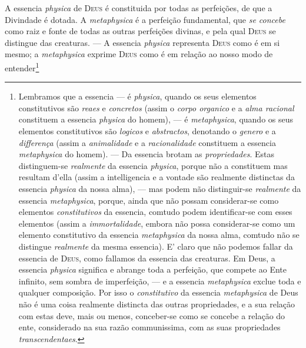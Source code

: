  A essencia \emph{physica} de
\textsc{Deus} é constituida por todas as perfeições, de que a Divindade é dotada. A
\emph{metaphysica} é a perfeição fundamental, que \emph{se concebe} como raiz e fonte de
todas as outras perfeições divinas, e pela qual \textsc{Deus} se distingue das
creaturas. --- A essencia \emph{physica} representa \textsc{Deus} como é em si mesmo; a
\emph{metaphysica} exprime \textsc{Deus} como é em relação ao nosso modo de
entender\footnote{Lembramos que a essencia --- é \emph{physica}, quando os seus elementos
constitutivos são \emph{reaes} e \emph{concretos} (assim o \emph{corpo organico} e a
\emph{alma racional} constituem a essencia \emph{physica} do homem), --- é
\emph{metaphysica}, quando os seus elementos constitutivos são \emph{logicos} e
\emph{abstractos}, denotando o \emph{genero} e a \emph{differença} (assim a
\emph{animalidade} e a \emph{racionalidade} constituem a essencia \emph{metaphysica} do
homem). --- Da essencia brotam as \emph{propriedades}. Estas distinguem-se
\emph{realmente} da essencia \emph{physica}, porque não a constituem mas resultam d'ella
(assim a intelligencia e a vontade são realmente distinctas da essencia \emph{physica} da
nossa alma), --- mas podem não distinguir-se \emph{realmente} da essencia
\emph{metaphysica}, porque, ainda que não possam considerar-se como elementos
\emph{constitutivos} da essencia, comtudo podem identificar-se com esses elementos (assim
a \emph{immortalidade}, embora não possa considerar-se como um elemento constitutivo da
essencia \emph{metaphysica} da nossa alma, comtudo não se distingue \emph{realmente} da
mesma essencia). E' claro que não podemos fallar da essencia de \textsc{Deus}, como
fallamos da essencia das creaturas. Em Deus, a essencia \emph{physica} significa e
abrange toda a perfeição, que compete ao Ente infinito, sem sombra de imperfeição, --- e
a essencia \emph{metaphysica} exclue toda e qualquer composição. Por isso o
\emph{constitutivo} da essencia \emph{metaphysica} de Deus não é uma coisa realmente
distincta das outras propriedades, e a sua relação com estas deve, mais ou menos,
conceber-se como se concebe a relação do ente, considerado na sua razão communissima, com
as suas propriedades \emph{transcendentaes}.

}
